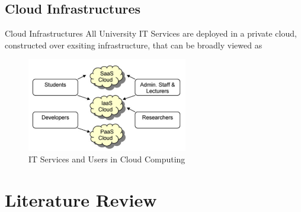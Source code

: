 \documentclass[10pt,xcolor=dvipsnames]{beamer}
\begin{document}
\subsection{Cloud Infrastructures}
\begin{frame}{Cloud Infrastructures}
All University IT Services are deployed in a private cloud, constructed over exsiting infrastructure, that can be broadly viewed as 
	
\begin{figure}[H]
\begin{center}
\includegraphics[width=7cm]{./it2.png}
\caption{ IT Services and Users in Cloud Computing\label{fig:IT Services and Users in Cloud Computing }}
\end{center}
\end{figure}	
	
	
\end{frame}


\section{Literature Review}
 
\end{document}

